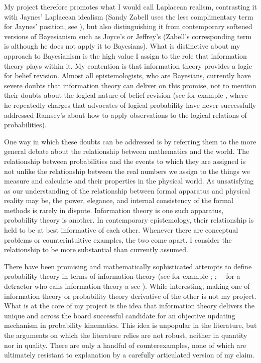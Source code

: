 \documentclass[phd,12pt,oneside]{ubcthesis}
\begin{document}
My project therefore promotes what I would call Laplacean realism,
contrasting it with Jaynes' Laplacean idealism (Sandy Zabell uses the
less complimentary term  for Jaynes'
position, see ), but also distinguishing it
from contemporary softened versions of Bayesianism such as Joyce's or
Jeffrey's (Zabell's corresponding term is 
although he does not apply it to Bayesians). What is distinctive about
my approach to Bayesianism is the high value I assign to the role that
information theory plays within it. My contention is that information
theory provides a logic for belief revision. Almost all
epistemologists, who are Bayesians, currently have severe doubts that
information theory can deliver on this promise, not to mention their
doubts about the logical nature of belief revision (see for example
, where he repeatedly charges that advocates of
logical probability have never successfully addressed Ramsey's
 about how to apply observations to the
logical relations of probabilities).

One way in which these doubts can be addressed is by referring them to
the more general debate about the relationship between mathematics and
the world. The relationship between probabilities and the events to
which they are assigned is not unlike the relationship between the
real numbers we assign to the things we measure and calculate and
their properties in the physical world. As unsatisfying as our
understanding of the relationship between formal apparatus and
physical reality may be, the power, elegance, and internal consistency
of the formal methods is rarely in dispute. Information theory is one
such apparatus, probability theory is another. In contemporary
epistemology, their relationship is held to be at best informative of
each other. Whenever there are conceptual problems or counterintuitive
examples, the two come apart. I consider the relationship to be more
substantial than currently assumed.

There have been promising and mathematically sophisticated attempts to
define probability theory in terms of information theory (see for
example ; ;
---for a detractor who calls information theory a
 see
). While interesting, making one of information
theory or probability theory derivative of the other is not my
project. What is at the core of my project is the idea that
information theory delivers the unique and across the board successful
candidate for an objective updating mechanism in probability
kinematics. This idea is unpopular in the literature, but the
arguments on which the literature relies are not robust, neither in
quantity nor in quality. There are only a handful of counterexamples,
none of which are ultimately resistant to explanation by a carefully
articulated version of my claim.
\end{document}
